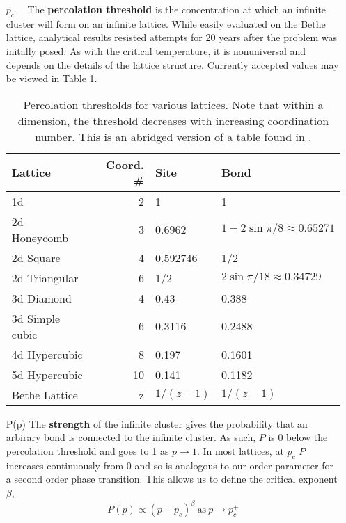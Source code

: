 \begin{enumerate}

\item[$p_c\quad$] The \textbf{percolation threshold} is the concentration at which an infinite cluster
will form on an infinite lattice.  While easily evaluated on the Bethe lattice, analytical
results resisted attempts for 20 years after the problem was initally posed.  As with
the critical temperature, it is nonuniversal and depends on the details of the lattice
structure.  Currently accepted values may be viewed in Table \ref{tab:perc_thresh}.

\begin{table}
  \centering
  \begin{tabular}{ | l | r | l | l | }
    \hline
    Lattice & Coord. \# & Site & Bond \\
    \hline \hline
    1d & 2 & 1 & 1 \\ \hline
    2d Honeycomb & 3 & 0.6962 & $1-2\sin{\pi/8}\approx 0.65271$ \\ \hline
    2d Square & 4 & 0.592746 & 1/2 \\ \hline
    2d Triangular & 6 & 1/2 & $2\sin{\pi/18}\approx 0.34729$ \\ \hline
    3d Diamond & 4 & 0.43 & 0.388 \\ \hline
    3d Simple cubic & 6 & 0.3116 & 0.2488 \\ \hline
    4d Hypercubic & 8 & 0.197 & 0.1601 \\ \hline
    5d Hypercubic & 10 & 0.141 & 0.1182 \\ \hline
    Bethe Lattice & z & $1 / (z-1)$ & $1 / (z-1)$ \\ \hline
  \end{tabular}
  \caption{Percolation thresholds for various lattices.  Note that within a dimension,
           the threshold decreases with increasing coordination number.  This is an
           abridged version of a table found in \cite{christensen02}.}
  \label{tab:perc_thresh}
\end{table}

\item[P(p)] The \textbf{strength} of the infinite cluster gives the probability that
an arbirary bond is connected to the infinite cluster.  As such, $P$ is 0 below
the percolation threshold and goes to 1 as $p\to 1$.  In most lattices, at $p_c$
$P$ increases continuously from 0 and so is analogous to our order parameter for a second
order phase transition.  This allows us to define the critical exponent $\beta$,
\[ P(p) \propto (p - p_c)^{\beta} \ \text{as}\ p\to p_c^+ \]


\end{enumerate}
